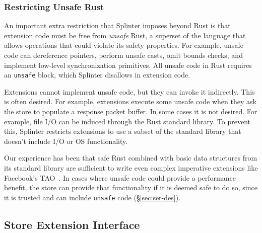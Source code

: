 \subsubsection{Restricting Unsafe Rust}
\label{sec:unsafe}

An important extra restriction that Splinter imposes beyond Rust is that
  extension code must be free from \emph{unsafe} Rust, a superset of the
  language that allows
  operations that could violate its safety properties.
For example, unsafe code can dereference pointers, perform unsafe casts, omit
  bounds checks, and implement low-level synchronization primitives.
All unsafe code in Rust requires an \texttt{unsafe} block, which
Splinter disallows in extension code.

Extensions cannot implement unsafe code, but they can invoke it indirectly.
This is often desired.
For example, extensions execute some unsafe code when they ask the store to
  populate a response packet buffer.
In some cases it is not desired.
For example, file I/O can be induced through the Rust standard
  library.
To prevent this, Splinter restricts extensions to use a subset of the standard
  library that doesn't include I/O or OS functionality.

Our experience has been that safe Rust combined with basic data structures from
  its standard library are sufficient to write even complex imperative extensions
  like Facebook's TAO~\cite{tao-2013}.
In cases where unsafe code could provide a performance benefit, the store can
  provide that functionality if it is deemed safe to do so, since it is trusted
  and can include \texttt{unsafe} code (\S\ref{sec:ser-des}).

\subsection{Store Extension Interface}
\label{sec:db-iface}

